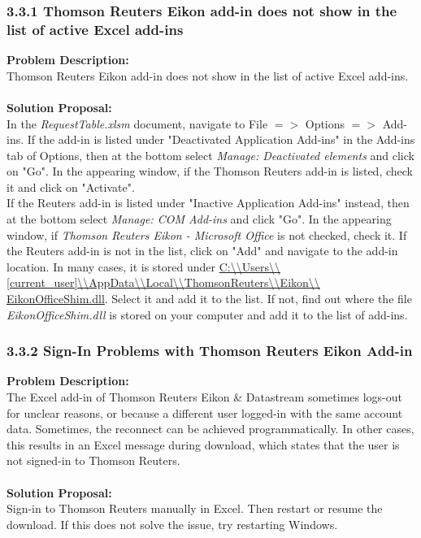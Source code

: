 \subsubsection{3.3.1 Thomson Reuters Eikon add-in does not show in the list of active Excel add-ins}
\textbf{Problem Description: }  \\
Thomson Reuters Eikon add-in does not show in the list of active Excel add-ins. \\ \\
\textbf{Solution Proposal:} \\
In the \textit{RequestTable.xlsm} document, navigate to File $ => $ Options $ => $ Add-ins. If the add-in is listed under "Deactivated Application Add-ins" in the Add-ins tab of Options, then at the bottom select \textit{Manage: Deactivated elements} and click on "Go". In the appearing window, if the Thomson Reuters add-in is listed, check it and click on "Activate". \\
If the Reuters add-in is listed under "Inactive Application Add-ins" instead, then at the bottom select \textit{Manage: COM Add-ins} and click "Go". In the appearing window, if \textit{Thomson Reuters Eikon - Microsoft Office} is not checked, check it. If the Reuters add-in is not in the list, click on "Add" and navigate to the add-in location. In many cases, it is stored under 
\url{C:\\Users\\[current_user]\\AppData\\Local\\ThomsonReuters\\Eikon\\} \\ \url{EikonOfficeShim.dll}. 
Select it and add it to the list. If not, find out where the file \textit{EikonOfficeShim.dll} is stored on your computer and add it to the list of add-ins. 

\subsubsection{3.3.2 Sign-In Problems with Thomson Reuters Eikon Add-in}
\textbf{Problem Description: }  \\
The Excel add-in of Thomson Reuters Eikon \& Datastream sometimes logs-out for unclear reasons, or because a different user logged-in with the same account data. Sometimes, the reconnect can be achieved programmatically. In other cases, this results in an Excel message during download, which states that the user is not signed-in to Thomson Reuters.  \\ \\
\textbf{Solution Proposal:} \\
Sign-in to Thomson Reuters manually in Excel. Then restart or resume the download. If this does not solve the issue, try restarting Windows. 

